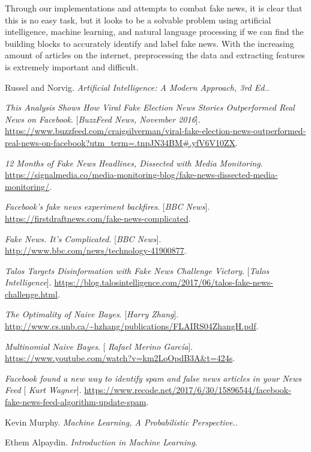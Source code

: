 \documentclass{neu_handout}
\begin{document}
Through our implementations and attempts to combat fake news, it is clear that this is no easy task, but it looks to be a solvable problem using artificial intelligence, machine learning, and natural language processing if we can find the building blocks to accurately identify and label fake news. With the increasing amount of articles on the internet, preprocessing the data and extracting features is extremely important and difficult.


\begin{thebibliography}{9}

Russel and Norvig. 
\textit{Artificial Intelligence: A Modern Approach, 3rd Ed.}. 

 
\textit{This Analysis Shows How Viral Fake Election News Stories Outperformed Real News on Facebook}.
[\textit{BuzzFeed News, November 2016}].
\url{https://www.buzzfeed.com/craigsilverman/viral-fake-election-news-outperformed-real-news-on-facebook?utm_term=.tnpJN34BM#.yfV6V10ZX}.
 

\textit{12 Months of Fake News Headlines, Dissected with Media Monitoring}. 
 \url{https://signalmedia.co/media-monitoring-blog/fake-news-dissected-media-monitoring/}.

\textit{Facebook's fake news experiment backfires}.
[\textit{BBC News}]. 
 \url{https://firstdraftnews.com/fake-news-complicated}.
 
 
\textit{Fake News. It's Complicated}.
[\textit{BBC News}]. 
 \url{http://www.bbc.com/news/technology-41900877}.
 
\textit{Talos Targets Disinformation with Fake News Challenge Victory}.
[\textit{Talos Intelligence}]. 
 \url{https://blog.talosintelligence.com/2017/06/talos-fake-news-challenge.html}.
 
\textit{The Optimality of Naive Bayes}.
[\textit{Harry Zhang}]. 
 \url{http://www.cs.unb.ca/~hzhang/publications/FLAIRS04ZhangH.pdf}.
 
 
\textit{Multinomial Naive Bayes}.
[\textit{
Rafael Merino García}]. 
 \url{https://www.youtube.com/watch?v=km2LoOpdB3A&t=424s}.
 
\textit{Facebook found a new way to identify spam and false news articles in your News Feed}
[\textit{
Kurt Wagner}]. 
 \url{https://www.recode.net/2017/6/30/15896544/facebook-fake-news-feed-algorithm-update-spam}.

Kevin Murphy. 
\textit{Machine Learning, A Probabilistic Perspective.}.

Ethem Alpaydin. 
\textit{Introduction in Machine Learning}.

\end{thebibliography}
\end{document}
